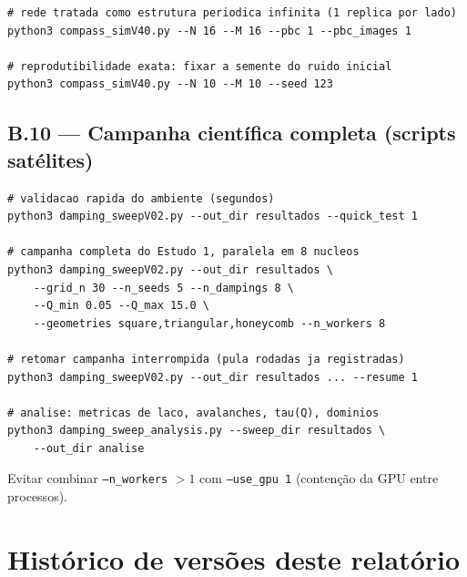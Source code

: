 \documentclass[11pt,a4paper]{article}
\newcommand{\code}[1]{\texttt{#1}}
\begin{document}
\begin{verbatim}
# rede tratada como estrutura periodica infinita (1 replica por lado)
python3 compass_simV40.py --N 16 --M 16 --pbc 1 --pbc_images 1

# reprodutibilidade exata: fixar a semente do ruido inicial
python3 compass_simV40.py --N 10 --M 10 --seed 123
\end{verbatim}

\subsection*{B.10 --- Campanha científica completa (scripts satélites)}

\begin{verbatim}
# validacao rapida do ambiente (segundos)
python3 damping_sweepV02.py --out_dir resultados --quick_test 1

# campanha completa do Estudo 1, paralela em 8 nucleos
python3 damping_sweepV02.py --out_dir resultados \
    --grid_n 30 --n_seeds 5 --n_dampings 8 \
    --Q_min 0.05 --Q_max 15.0 \
    --geometries square,triangular,honeycomb --n_workers 8

# retomar campanha interrompida (pula rodadas ja registradas)
python3 damping_sweepV02.py --out_dir resultados ... --resume 1

# analise: metricas de laco, avalanches, tau(Q), dominios
python3 damping_sweep_analysis.py --sweep_dir resultados \
    --out_dir analise
\end{verbatim}
Evitar combinar \code{--n\_workers} $> 1$ com \code{--use\_gpu 1}
(contenção da GPU entre processos).

\section*{Histórico de versões deste relatório}
\end{document}
